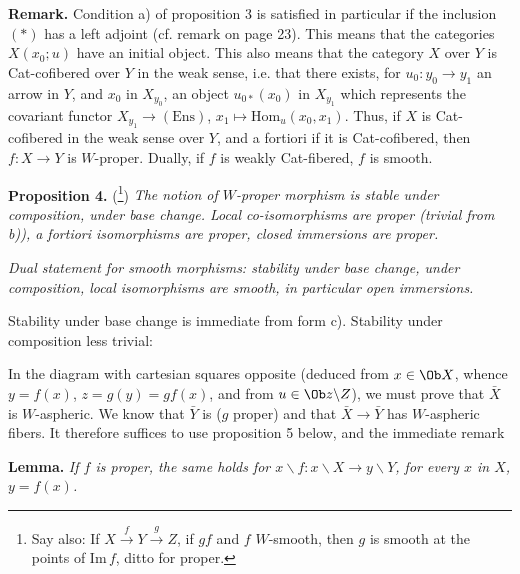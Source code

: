 \textbf{Remark.} Condition a) of proposition 3 is satisfied in particular if the inclusion $(*)$ has a left adjoint (cf. remark on page 23). This means that the categories $X(x_0;u)$ have an initial object. This also means that the category $X$ over $Y$ is Cat-cofibered over $Y$ in the weak sense, i.e. that there exists, for $u_0 : y_0 \longrightarrow y_1$ an arrow in $Y$, and $x_0$ in $X_{y_0}$, an object $u_{0*}(x_0)$ in $X_{y_1}$ which represents the covariant functor $X_{y_1} \longrightarrow (\mathrm{Ens})$, $x_1 \longmapsto \mathrm{Hom}_u(x_0, x_1)$. Thus, if $X$ is Cat-cofibered in the weak sense over $Y$, and a fortiori if it is Cat-cofibered, then $f : X \longrightarrow Y$ is $W$-proper. Dually, if $f$ is weakly Cat-fibered, $f$ is smooth.

\textbf{Proposition 4.} (\footnote[43]{Say also: If $X \xrightarrow{f} Y \xrightarrow{g} Z$, if $gf$ and $f$ $W$-smooth, then $g$ is smooth at the points of $\mathrm{Im}\, f$, ditto for proper.}) \textit{The notion of $W$-proper morphism is stable under composition, under base change. Local co-isomorphisms are proper (trivial from b)), a fortiori isomorphisms are proper, closed immersions are proper.}

\textit{Dual statement for smooth morphisms: stability under base change, under composition, local isomorphisms are smooth, in particular open immersions.}

Stability under base change is immediate from form c). Stability under composition less trivial:

\begin{center}
\end{center}

In the diagram with cartesian squares opposite (deduced from $x \in \Ob X$, whence $y = f(x)$, $z = g(y) = gf(x)$, and from $u \in \Ob z\backslash Z$), we must prove that $\bar{X}$ is $W$-aspheric. We know that $\bar{Y}$ is ($g$ proper) and that $\bar{X} \longrightarrow \bar{Y}$ has $W$-aspheric fibers. It therefore suffices to use proposition 5 below, and the immediate remark %

\textbf{Lemma.} \textit{If $f$ is proper, the same holds for $x\backslash f : x\backslash X \longrightarrow y\backslash Y$, for every $x$ in $X$, $y = f(x)$.}